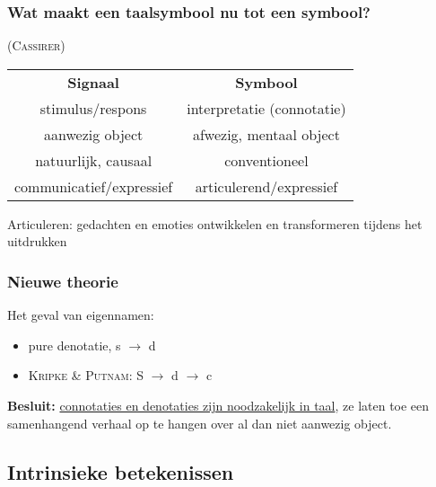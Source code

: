 \subsubsection*{Wat maakt een taalsymbool nu tot een symbool? } (\textsc{Cassirer})
\begin{center}
\begin{tabular}{c c}
\textbf{Signaal} & \textbf{Symbool}\\
stimulus/respons & interpretatie (connotatie)\\
aanwezig object & afwezig, mentaal object\\
natuurlijk, causaal & conventioneel\\
communicatief/expressief & articulerend/expressief\\
\end{tabular}
\end{center}

Articuleren: gedachten en emoties ontwikkelen en transformeren tijdens het uitdrukken


\subsubsection*{Nieuwe theorie}
Het geval van eigennamen:
\begin{itemize}
\item pure denotatie, s $\rightarrow$ d
\item \textsc{Kripke \& Putnam}: S $\rightarrow$ d $\rightarrow$ c
\end{itemize}

\textbf{Besluit:} \underline{connotaties en denotaties zijn noodzakelijk in taal}, ze laten toe een samenhangend verhaal op te hangen over al dan niet aanwezig object.

\subsection{Intrinsieke betekenissen}

